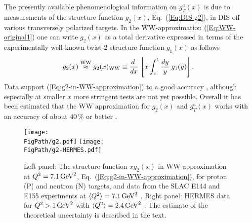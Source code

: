 \documentclass[a4paper,11pt]{article}
\newcommand{\be}{\begin{equation}}
\newcommand{\ee}{\end{equation}}
\newcommand{\la}{\langle}
\newcommand{\ra}{\rangle}
\newcommand*{\FigPath}{./figs}%
\begin{document}
The presently available phenomenological information on $g_T^a(x)$ is due
to measurements of the structure function $g_2(x)$, Eq.~(\ref{Eq:DIS-g2}),
in DIS off various transversely polarized targets. In the WW-approximation
(\ref{Eq:WW-original1}) one can write $g_2(x)$ as a total derivative
expressed in terms of the experimentally well-known twist-2
structure function $g_1(x)$ as follows
\be
    	g_2(x) \stackrel{\rm WW}{\approx} g_2(x)_{\rm WW} \equiv
	\frac{ d\;}{ d x}\;\Biggl[x\int_x^1\frac{ d y}{y}
	\;g_1(y)\Biggr]\,.\label{Eq:g2-in-WW-approximation}
\ee
Data support (\ref{Eq:g2-in-WW-approximation}) to a good accuracy
\cite{Anthony:2002hy,Adams:1994id,Abe:1998wq,Airapetian:2011wu}, although especially
at smaller $x$ more stringent tests are not yet possible. Overall it has
been estimated that the WW approximation for $g_2(x)$ and $g_T^a(x)$ works
with an accuracy of about $40\,\%$ or better \cite{Accardi:2009au}.

\begin{figure}[b!]
\centering
\texttt{[image: \\FigPath/g2.pdf]}
\texttt{[image: \\FigPath/g2-HERMES.pdf]}
\caption{\label{Fig:g2}
Left panel: The structure function $xg_2(x)$ in WW-approximation at $Q^2=7.1\,{\rm GeV}^2$,
Eq.~(\ref{Eq:g2-in-WW-approximation}), for proton (P) and neutron (N) targets,
and data from the SLAC E144 and E155 experiments at
$\la Q^2\ra=7.1\,{\rm GeV}^2$ \cite{Anthony:2002hy,Abe:1998wq}.
Right panel: HERMES data for $Q^2>1\,{\rm GeV}^2$ with
$\la Q^2\ra=2.4\,{\rm GeV}^2$ \cite{Airapetian:2011wu}.
The estimate of the theoretical uncertainty is described in the text.}
\end{figure}
\end{document}
